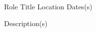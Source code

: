 

\begin{cventries}

  \cventry
  {Role} %
  {Title} %
  {Location} %
  {Dates(s)} %
  {
    \begin{cvitems} %
      \item {Description(s)}
    \end{cvitems}
  }

\end{cventries}
